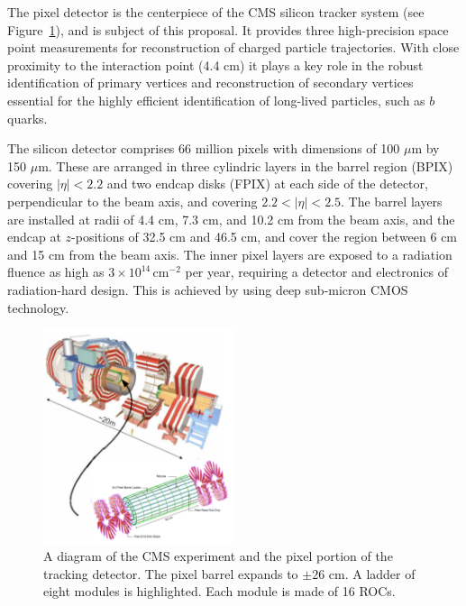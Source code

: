 The pixel detector  is the centerpiece of the CMS silicon tracker system 
(see Figure~\ref{fig:SiPix}), 
and is subject of this proposal.
It provides three high-precision space point measurements for 
reconstruction of charged particle trajectories. 
With close proximity to the interaction point (4.4 cm) it plays a key role 
in the robust identification of 
primary vertices and reconstruction of secondary vertices essential for 
the highly efficient identification 
of long-lived particles, such as $b$ quarks. 
 
The silicon detector comprises 66 million pixels with dimensions of 100 
$\mu$m by 150 $\mu$m.
These are arranged in three cylindric layers in the barrel region (BPIX) 
covering $|\eta| < 2.2$ 
and two endcap disks (FPIX)  at each side of the detector, perpendicular 
to the beam axis, and covering $2.2 < |\eta| < 2.5$.
The barrel layers are installed at radii of 4.4 cm, 7.3 cm, and 10.2 cm 
from 
the beam axis, and the endcap at $z$-positions of 32.5 cm and 46.5 cm, and 
cover the region 
between 6 cm and 15 cm from the beam axis. 
The inner pixel layers are exposed to a radiation fluence as high as 
$3\times 10^{14} \,\mathrm{cm}^{-2} $ 
per year, requiring a detector and electronics of radiation-hard design. 
This is achieved by using deep sub-micron CMOS technology.

%
%
\begin{figure}[htb]
  \centering
  \includegraphics[width=0.5\textwidth]{CMSnSiPix.pdf}
  \caption{\label{fig:SiPix}
  A diagram of the CMS experiment and the pixel portion of the tracking 
detector.
  The pixel barrel expands to $\pm26$ cm. A ladder of eight modules is 
highlighted. Each
module is made of 16 ROCs. 
  }
\end{figure}


